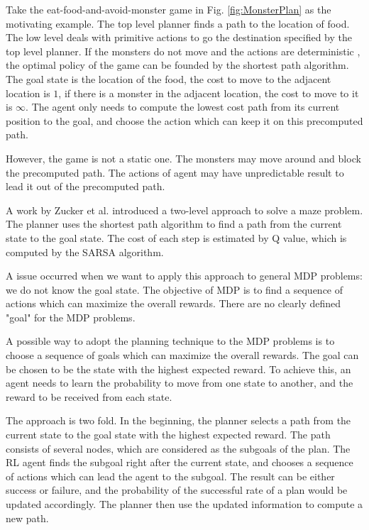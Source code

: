 Take the eat-food-and-avoid-monster game in Fig. \ref{fig:MonsterPlan} as the motivating example. 
The top level planner finds a path to the location of food. 
The low level deals with primitive actions to go the destination specified by the top level planner.
If the monsters do not move and the actions are deterministic
, the optimal policy of the game can be founded by the shortest path algorithm. The goal state is the location of the food,
the cost to move to the adjacent location is $1$, if there is a monster in the adjacent location, the cost 
to move to it is $\infty$. The agent only needs to compute the lowest cost path from its current position to the goal,
and choose the action which can keep it on this precomputed path.

However, the game is not a static one. The monsters may move around and block the precomputed path. The actions of
agent may have unpredictable result to lead it out of the precomputed path.

A work by Zucker et al. \cite{Planner} introduced a two-level approach to solve a maze problem.
The planner uses the shortest path algorithm to find a path from the current state to the goal state.
The cost of each step is estimated by Q value, which is computed by the SARSA algorithm.

A issue occurred when we want to apply this approach to general MDP problems: we do not know the 
goal state. The objective of MDP is to find a sequence of actions which can maximize the overall 
rewards. There are no clearly defined "goal" for the MDP problems.

A possible way to adopt the planning technique to the MDP problems is to choose a sequence 
of goals which can maximize the overall rewards. The goal can be chosen to be the state
with the highest expected reward. To achieve this, an agent needs to learn 
the probability to move from one state to another, and the reward to be received
from each state. 

The approach is two fold. In the beginning, the planner selects a path from the current 
state to the goal state with the highest expected reward. The path consists of several
nodes, which are considered as the subgoals of the plan. The RL agent finds the subgoal 
right after the current state, and chooses a sequence of actions which can lead the agent
to the subgoal. The result can be either success or failure, and the probability of the successful
rate of a plan would be updated accordingly. The planner then use the updated information to 
compute a new path.


